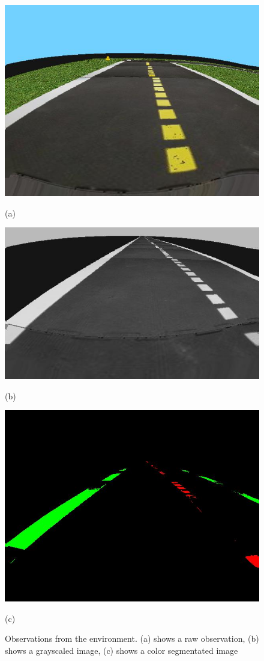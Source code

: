 \documentclass{article}
\begin{document}
\begin{figure}[h!]
	\centering
	\begin{minipage}{.3\textwidth}
	\centering
	\includegraphics[width=0.8\linewidth]{rawobs.jpg}
	\caption{(a)}
	\end{minipage}%
	\begin{minipage}{.3\textwidth}
	\centering
	\includegraphics[width=0.8\linewidth]{grayscale.jpg}
	\caption{(b)}
	\end{minipage}%
\begin{minipage}{.3\textwidth}
	\centering
	\includegraphics[width=0.8\linewidth]{colorseg.jpg}
	\caption{(c)}
\end{minipage}
\caption{Observations from the environment. (a) shows a raw observation, (b) shows a grayscaled image, (c) shows a color segmentated image}
\end{figure}
\end{document}

